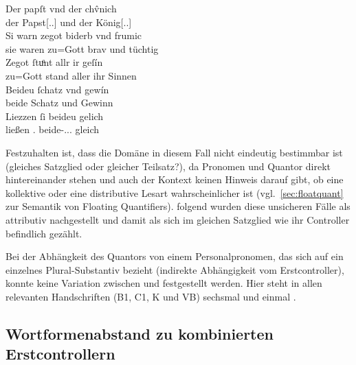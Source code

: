 \begin{exe}
\ex\label{ex:papstkoenig4} %
	\gll Der papſt vnd der chv̂nich \\
		der Papst[\Nom.\Sg.\MascM] und der König[\Nom.\Sg.\MascM] \\
\sn \gll Si warn zegot biderb vnd frumic \\
		sie waren {zu=Gott} brav und tüchtig \\
\sn \gll Zegot ſtuͦnt allr ir geſín \\
		{zu=Gott} stand aller ihr Sinnen \\
\sn \gll Beideu ſchatz vnd gewín \\
		beide Schatz und Gewinn \\
\sn \gll Liezzen ſi beideu gelich \\
		ließen \Tpl\subM.\Nom{} beide-\Nom.\Pl.\NeutM.\St{} gleich \\
	\begin{taggedline}{\parencites[\pno~17vb,30--34]{kc:B1}[vgl. abweichend][6110--6113]{schroeder1895}}
	\trans {}
	\end{taggedline}
\end{exe}

Festzuhalten ist, dass die Domäne in diesem Fall nicht eindeutig bestimmbar ist
(gleiches Satzglied oder gleicher Teilsatz?), da Pronomen und Quantor direkt
hintereinander stehen und auch der Kontext keinen Hinweis darauf gibt, ob eine
kollektive oder eine distributive Lesart wahrscheinlicher ist
(vgl.~\cref{sec:floatquant} zur Semantik von Floating Quantifiers).
\citet[623]{ksw2} folgend wurden diese unsicheren Fälle als attributiv
nachgestellt und damit als sich im gleichen Satzglied wie ihr Controller
befindlich gezählt.

Bei der Abhängkeit des Quantors von einem Personalpronomen, das sich auf ein
einzelnes Plural-Substantiv bezieht (indirekte Abhängigkeit vom
Erstcontroller), konnte keine Variation zwischen  und 
festgestellt werden. Hier steht in allen relevanten Handschriften
(B1, C1, K und VB) sechsmal
 und einmal  \autocites(zu insgesamt vier
Stellen)[\pno~31va,30--31]{kc:B1}.

\subsection{Wortformenabstand zu kombinierten Erstcontrollern}

